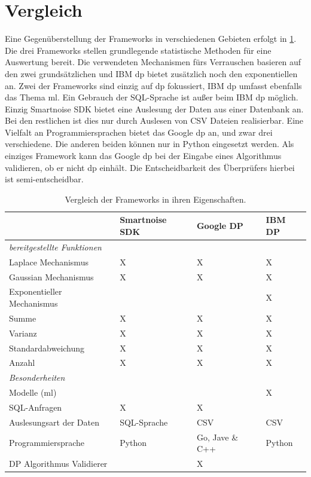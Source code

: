 \section{Vergleich}
Eine Gegenüberstellung der Frameworks in verschiedenen Gebieten erfolgt in \cref{tab : compare_frameworks}. Die drei Frameworks stellen grundlegende statistische Methoden für eine Auswertung bereit. Die verwendeten Mechanismen fürs Verrauschen basieren auf den zwei grundsätzlichen und IBM \gls{dp} bietet zusätzlich noch den exponentiellen an.  Zwei der Frameworks sind einzig auf \gls{dp} fokussiert, IBM \gls{dp} umfasst ebenfalls das Thema \gls{ml}. Ein Gebrauch der SQL-Sprache ist außer beim IBM \gls{dp} möglich. Einzig Smartnoise SDK bietet eine Auslesung der Daten aus einer Datenbank an. Bei den restlichen ist dies nur durch Auslesen von CSV Dateien realisierbar. Eine Vielfalt an Programmiersprachen bietet das Google \gls{dp} an, und zwar drei verschiedene. Die anderen beiden können nur in Python eingesetzt werden. Als einziges Framework kann das Google \gls{dp} bei der Eingabe eines Algorithmus validieren, ob er nicht \gls{dp} einhält. Die Entscheidbarkeit des Überprüfers hierbei ist semi-entscheidbar.

\begin{table}[h]
	\centering
	\begin{tabular}{ l l l l} \toprule
		& \textbf{Smartnoise SDK} & \textbf{Google DP} & \textbf{IBM DP}  \\ \midrule
		\textit{bereitgestellte Funktionen}	&  & &\\ \hline
		Laplace Mechanismus	& X  & X & X\\
		Gaussian Mechanismus	& X & X & X\\
		Exponentieller Mechanismus	&  & & X\\
		Summe	&  X & X & X\\
		Varianz   &  X & X & X\\
		Standardabweichung & X & X &X\\
		Anzahl	&  X & X & X\\ \hline
		\textit{Besonderheiten} & & &\\ \hline
		Modelle (\gls{ml})	&  & & X\\ 
		SQL-Anfragen	&  X & X &\\ 
		Auslesungsart der Daten	&  SQL-Sprache&CSV  & CSV\\ 
		Programmiersprache	&  Python& Go, Jave \& C++ & Python\\ 
		DP Algorithmus Validierer	&  & X &\\ \bottomrule
	\end{tabular}
	\caption{Vergleich der Frameworks in ihren Eigenschaften.}
	\label{tab : compare_frameworks}
\end{table}
